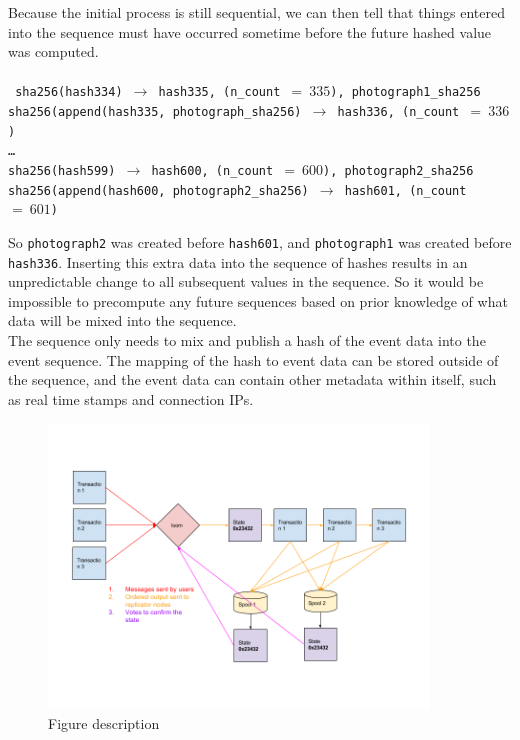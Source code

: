 \documentclass[12pt]{article}
\begin{document}
Because the initial process is still sequential, we can then tell that things entered into the sequence must have occurred sometime before the future hashed value was computed.\\\\\noindent
\texttt{
sha256(hash334) $\rightarrow$ hash335, (n\_count $=~335$), photograph1\_sha256\\
sha256(append(hash335, photograph\_sha256) $\rightarrow$ hash336,
(n\_count $=~336$)\\
\ldots\\
sha256(hash599) $\rightarrow$ hash600, (n\_count $=~600$), photograph2\_sha256
sha256(append(hash600, photograph2\_sha256) $\rightarrow$ hash601,
(n\_count $=~601$)\\
}

So \texttt{photograph2} was created before \texttt{hash601}, and
\texttt{photograph1} was created before \texttt{hash336}. Inserting this extra data into the sequence of hashes results in an unpredictable change to all subsequent values in the sequence. So it would be impossible to precompute any future sequences based on prior knowledge of what data will be mixed into the sequence.\\

The sequence only needs to mix and publish a hash of the event data into the event sequence. The mapping of the hash to event data can be stored outside of the sequence, and the event data can contain other metadata within itself, such as real time stamps and connection IPs.\\

\begin{figure}
  \begin{center}
    \centering
    \includegraphics[width=0.9\textwidth]{figures/fig_3.png}
    \caption[Fig 3]{Figure description \label{fig_3}}
  \end{center}
  \end{figure}
\end{document}
